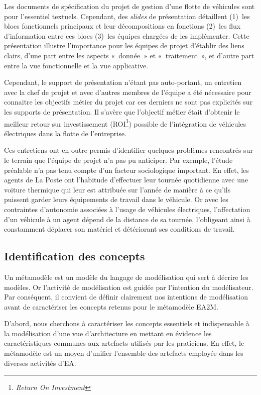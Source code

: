 Les documents de spécification du projet de gestion d'une flotte de véhicules
sont pour l'essentiel textuels. Cependant, des \textit{slides} de présentation
détaillent (1)~les blocs fonctionnels principaux et leur décompositions en
fonctions (2)~les flux d'information entre ces blocs (3)~les équipes chargées
de les implémenter. Cette présentation illustre l'importance pour les équipes
de projet d'établir des liens clairs, d'une part entre les aspects «~donnée~»
et «~traitement~», et d'autre part entre la vue fonctionnelle et la vue
applicative.

Cependant, le support de présentation n'étant pas auto-portant, un entretien
avec la chef de projet et avec d'autres membres de l'équipe a été nécessaire
pour connaitre les objectifs métier du projet car ces derniers ne sont pas
explicités sur les supports de présentation. Il s'avère que l'objectif métier
était d'obtenir le meilleur retour sur investissement
(ROI\footnote{\textit{Return On Investment}}) possible de l'intégration de
véhicules électriques dans la flotte de l'entreprise.

Ces entretiens ont en outre permis d'identifier quelques problèmes rencontrés
sur le terrain que l'équipe de projet n'a pas pu anticiper. Par exemple, l'étude
préalable n'a pas tenu compte d'un facteur sociologique important. En effet,
les agents de La Poste ont l'habitude d'effectuer leur tournée quotidienne avec
une voiture thermique qui leur est attribuée sur l'année de manière à ce qu'ils
puissent garder leurs équipements de travail dans le véhicule. Or avec les
contraintes d'autonomie associées à l'usage de véhicules électriques,
l'affectation d'un véhicule à un agent dépend de la distance de sa tournée,
l'obligeant ainsi à constamment déplacer son matériel et détériorant ses
conditions de travail.

\subsection{Identification des concepts}
    \label{sec:conceptualisation}

    Un métamodèle est un modèle du langage de modélisation qui sert à décrire les modèles.
    Or l'activité de modélisation est guidée par l’intention du modélisateur.
    Par conséquent, il convient de définir clairement nos intentions de modélisation
    avant de caractériser les concepts retenus pour le métamodèle EA2M.

    D'abord, nous cherchons à caractériser les concepts essentiels et indispensable à la
    modélisation d'une vue d'architecture en mettant en évidence les caractéristiques communes
    aux artefacts utilisés par les praticiens. En effet, le métamodèle est un moyen d'unifier
    l'ensemble des artefacts employée dans les diverses activités d'EA.

